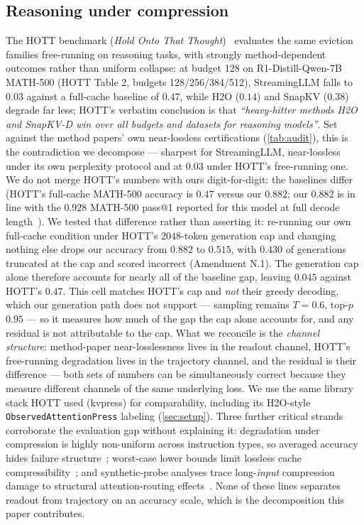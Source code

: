 \documentclass{article}
\begin{document}
\subsection{Reasoning under compression}
The HOTT benchmark (\emph{Hold Onto That Thought})~\citep{hott2025} evaluates the same eviction families free-running on reasoning tasks, with strongly method-dependent outcomes rather than uniform collapse: at budget 128 on R1-Distill-Qwen-7B MATH-500 (HOTT Table 2, budgets 128/256/384/512), StreamingLLM falls to $0.03$ against a full-cache baseline of $0.47$, while H2O ($0.14$) and SnapKV ($0.38$) degrade far less; HOTT's verbatim conclusion is that \emph{``heavy-hitter methods H2O and SnapKV-D win over all budgets and datasets for reasoning models''}. Set against the method papers' own near-lossless certifications (\cref{tab:audit}), this is the contradiction we decompose --- sharpest for StreamingLLM, near-lossless under its own perplexity protocol and at $0.03$ under HOTT's free-running one. We do not merge HOTT's numbers with ours digit-for-digit: the baselines differ (HOTT's full-cache MATH-500 accuracy is $0.47$ versus our $0.882$; our $0.882$ is in line with the $0.928$ MATH-500 pass@1 reported for this model at full decode length~\citep{deepseek2025r1}). We tested that difference rather than asserting it: re-running our own full-cache condition under HOTT's $2048$-token generation cap and changing nothing else drops our accuracy from $0.882$ to $0.515$, with $0.430$ of generations truncated at the cap and scored incorrect (Amendment N.1). The generation cap alone therefore accounts for nearly all of the baseline gap, leaving $0.045$ against HOTT's $0.47$. This cell matches HOTT's cap and \emph{not} their greedy decoding, which our generation path does not support --- sampling remains $T{=}0.6$, top-$p$ $0.95$ --- so it measures how much of the gap the cap alone accounts for, and any residual is not attributable to the cap. What we reconcile is the \emph{channel structure}: method-paper near-losslessness lives in the readout channel, HOTT's free-running degradation lives in the trajectory channel, and the residual is their difference --- both sets of numbers can be simultaneously correct because they measure different channels of the same underlying loss. We use the same library stack HOTT used (kvpress) for comparability, including its H2O-style \texttt{ObservedAttentionPress} labeling (\cref{sec:setup}). Three further critical strands corroborate the evaluation gap without explaining it: degradation under compression is highly non-uniform across instruction types, so averaged accuracy hides failure structure~\citep{pitfalls2025}; worst-case lower bounds limit lossless cache compressibility~\citep{barriers2025}; and synthetic-probe analyses trace long-\emph{input} compression damage to structural attention-routing effects~\citep{physics2026}. None of these lines separates readout from trajectory on an accuracy scale, which is the decomposition this paper contributes.
\end{document}
